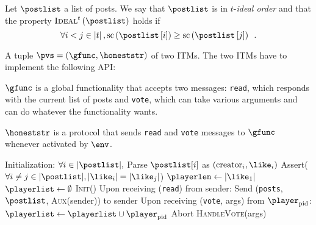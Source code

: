     \begin{definition}
      Let $\postlist$ a list of posts. We say that $\postlist$ is in
      $t$-\emph{ideal order} and that the property
      $\textsc{Ideal}^{t}\left(\postlist\right)$ holds if
      \begin{equation*}
        \forall i < j \in \left|t\right|,
        \mathrm{sc}\left(\postlist\left[i\right]\right) \geq
        \mathrm{sc}\left(\postlist\left[j\right]\right) \enspace.
      \end{equation*}
    \end{definition}

    \begin{definition}
      A tuple $\pvs = \left(\gfunc, \honeststr\right)$ of two ITMs. The two ITMs
      have to implement the following API:

      $\gfunc$ is a global functionality that accepts two messages:
      \texttt{read}, which responds with the current list of posts and
      \texttt{vote}, which can take various arguments and can do whatever the
      functionality wants.

      $\honeststr$ is a protocol that sends \texttt{read} and \texttt{vote}
      messages to $\gfunc$ whenever activated by $\env$.
    \end{definition}

    \begin{algorithm}[H]
      \caption{$\gfunc\left(\textsc{Init}, \textsc{Aux},
      \textsc{HandleVote}\right)\left(\postlist\right)$}
      \label{alg:gfunc}
      \begin{algorithmic}[1]
        \State Initialization:
        \Indent
          \State $\forall i \in |\postlist|,$ Parse $\postlist[i]$ as
          $\left(\mathrm{creator}_i, \like_i\right)$
          \State Assert($\forall i \neq j \in |\postlist|, |\like_i| =
          |\like_j|$)
          \State $\playerlen \gets |\like_1|$
          \State $\playerlist \gets \emptyset$
          \State \textsc{Init}()
        \EndIndent
        \State
        \State Upon receiving (\texttt{read}) from sender:
        \Indent
          \State Send (\texttt{posts}, $\postlist$, \textsc{Aux}(sender)) to sender
        \EndIndent
        \State
        \State Upon receiving (\texttt{vote}, args) from $\player_{\mathrm{pid}}$:
         \Indent
           \State $\playerlist \gets \playerlist \cup \player_{\mathrm{pid}}$
           \If{$|\playerlist| > \playerlen$}
             \State Abort
           \EndIf
           \State \textsc{HandleVote}(args)
         \EndIndent
      \end{algorithmic}
    \end{algorithm}

